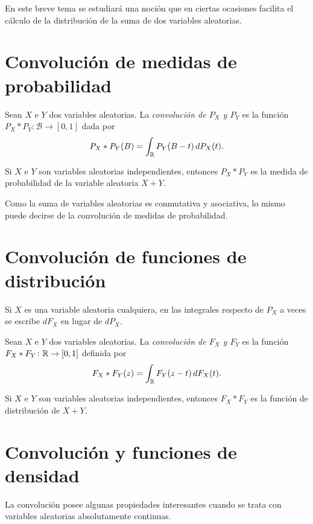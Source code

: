 \documentclass[a4paper, 11pt, extrafontsizes]{memoir}
\begin{document}
En este breve tema se estudiará una noción que en ciertas ocasiones facilita el cálculo de la distribución de la suma de dos variables aleatorias.

\section{Convolución de medidas de probabilidad}

\begin{definition}
    Sean $X$ e $Y$ dos variables aleatorias. La \emph{convolución de $P_X$ y $P_Y$} es la función $P_X\ast P_Y \colon \mathcal{B} \to [0,1]$ dada por
    \[P_X \ast P_Y(B) = \int_\mathbb R P_Y(B-t)\, dP_X(t).\]
\end{definition}

\begin{proposition}
    Si $X$ e $Y$ son variables aleatorias independientes, entonces $P_X \ast P_Y$ es la medida de probabilidad de la variable aleatoria $X+Y$.
\end{proposition}

Como la suma de variables aleatorias es conmutativa y asociativa, lo mismo puede decirse de la convolución de medidas de probabilidad.

\section{Convolución de funciones de distribución}

Si $X$ es una variable aleatoria cualquiera, en las integrales respecto de $P_X$ a veces se escribe $dF_X$ en lugar de $dP_X$. 

\begin{definition}
    Sean $X$ e $Y$ dos variables aleatorias. La \emph{convolución de $F_X$ y $F_Y$} es la función $F_X \ast F_Y \colon \mathbb R \to [0,1]$ definida por
    \[F_X \ast F_Y(z) = \int_\mathbb R F_Y(z-t) \, dF_X(t).\]
\end{definition}

\begin{proposition}
    Si $X$ e $Y$ son variables aleatorias independientes, entonces $F_X \ast F_Y$ es la función de distribución de $X+Y$.
\end{proposition}

\section{Convolución y funciones de densidad}

La convolución posee algunas propiedades interesantes cuando se trata con variables aleatorias absolutamente continuas.
\end{document}
